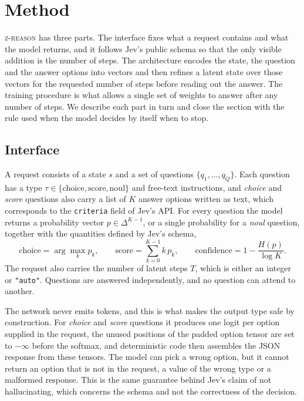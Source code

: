 \documentclass{article}
\newcommand{\zr}{\textsc{z-reason}}
\begin{document}
\section{Method}
\label{sec:method}

\zr{} has three parts. The interface fixes what a request contains and what the model returns, and it follows Jev's public schema so that the only visible addition is the number of steps. The architecture encodes the state, the question and the answer options into vectors and then refines a latent state over those vectors for the requested number of steps before reading out the answer. The training procedure is what allows a single set of weights to answer after any number of steps. We describe each part in turn and close the section with the rule used when the model decides by itself when to stop.

\subsection{Interface}

A request consists of a state $s$ and a set of questions $\{q_1, \dots, q_Q\}$. Each question has a type $\tau \in \{\text{choice}, \text{score}, \text{noul}\}$ and free-text instructions, and \emph{choice} and \emph{score} questions also carry a list of $K$ answer options written as text, which corresponds to the \texttt{criteria} field of Jev's API. For every question the model returns a probability vector $p \in \Delta^{K-1}$, or a single probability for a \emph{noul} question, together with the quantities defined by Jev's schema,
\begin{equation}
\text{choice} = \arg\max_k p_k, \qquad \text{score} = \sum_{k=0}^{K-1} k\, p_k, \qquad \text{confidence} = 1 - \frac{H(p)}{\log K}.
\label{eq:derived}
\end{equation}
The request also carries the number of latent steps $T$, which is either an integer or \texttt{"auto"}. Questions are answered independently, and no question can attend to another.

The network never emits tokens, and this is what makes the output type safe by construction. For \emph{choice} and \emph{score} questions it produces one logit per option supplied in the request, the unused positions of the padded option tensor are set to $-\infty$ before the softmax, and deterministic code then assembles the JSON response from these tensors. The model can pick a wrong option, but it cannot return an option that is not in the request, a value of the wrong type or a malformed response. This is the same guarantee behind Jev's claim of not hallucinating, which concerns the schema and not the correctness of the decision.
\end{document}
